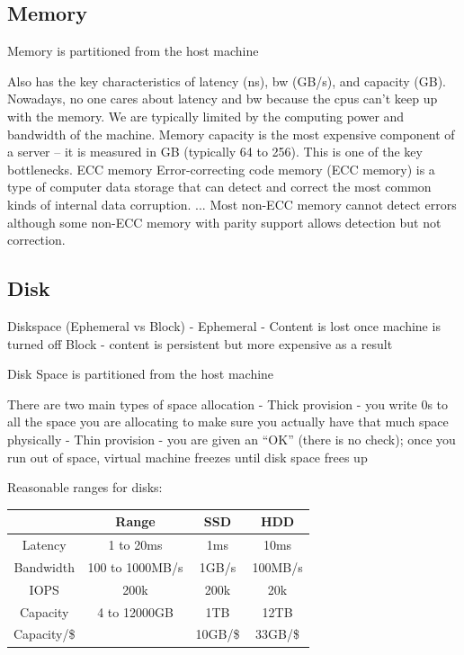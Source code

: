 \documentclass[fancy,11pt,titlestyle=display]{style/elegantbook}
\begin{document}
\subsection*{Memory}

Memory is partitioned from the host machine

Also has the key characteristics of latency (ns), bw (GB/s), and capacity (GB). Nowadays, no one cares about latency and bw because the cpus can't keep up with the memory. We are typically limited by the computing power and bandwidth of the machine. Memory capacity is the most expensive component of a server -- it is measured in GB (typically 64 to 256). This is one of the key bottlenecks.
ECC memory
 Error-correcting code memory (ECC memory) is a type of computer data storage that can detect and correct the most common kinds of internal data corruption. ... Most non-ECC memory cannot detect errors although some non-ECC memory with parity support allows detection but not correction.


\subsection*{Disk}

Diskspace (Ephemeral vs Block)
- Ephemeral - Content is lost once machine is turned off
Block - content is persistent but more expensive as a result

Disk Space is partitioned from the host machine

There are two main types of space allocation
- Thick provision - you write 0s to all the space you are allocating to make sure you actually have that much space physically
- Thin provision - you are given an ``OK'' (there is no check); once you run out of space, virtual machine freezes until disk space frees up

\par Reasonable ranges for disks:

\begin{tabular}{ c | c | c | c }
            & Range             & SSD       & HDD \\ \hline
Latency     & 1 to 20ms         & 1ms       & 10ms \\ 
Bandwidth   & 100 to 1000MB/s   & 1GB/s     & 100MB/s \\  
IOPS        & 200k              & 200k      & 20k \\
Capacity    & 4 to 12000GB      & 1TB       & 12TB \\
Capacity/\$ &                   & 10GB/\$   & 33GB/\$\\
\end{tabular}
\end{document}
